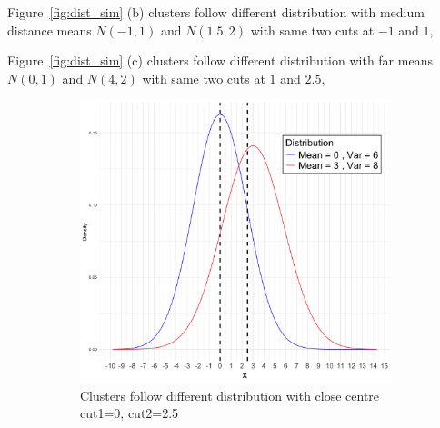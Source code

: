 \documentclass{article}
\begin{document}
Figure~\ref*{fig:dist_sim} (b) clusters follow different distribution with medium distance means $N(-1,1)$ and $N(1.5,2)$
with same two cuts at $-1$ and $1$,

Figure~\ref*{fig:dist_sim} (c) clusters follow different distribution with far means $N(0,1)$ and $N(4,2)$
with same two cuts at $1$ and $2.5$,

\begin{figure}[htbp!]
  \centering
  \begin{subfigure}{0.32\textwidth}  %
    \centering
    \includegraphics[width=\textwidth]{images/dist_simu/norm_dist_close.png} %
    \caption{Clusters follow different distribution with close centre\\ cut1=0, cut2=2.5}
\end{subfigure}
  \hfill
  \begin{subfigure}{0.32\textwidth}  %
    \centering

\end{subfigure}
\end{figure}
\end{document}
